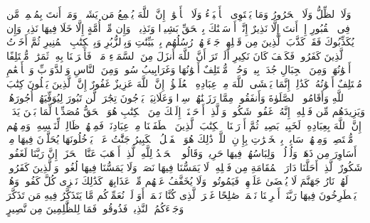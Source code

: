 وَلَا ٱلظِّلُّ وَلَا ٱلۡحَرُورُ%
\stopbuffer%
\startbuffer[\q:35:22]
وَمَا یَسۡتَوِی ٱلۡأَحۡیَاۤءُ وَلَا ٱلۡأَمۡوَٰتُۚ إِنَّ ٱللَّهَ یُسۡمِعُ مَن یَشَاۤءُۖ وَمَاۤ أَنتَ بِمُسۡمِعࣲ مَّن فِی ٱلۡقُبُورِ%
\stopbuffer%
\startbuffer[\q:35:23]
إِنۡ أَنتَ إِلَّا نَذِیرٌ%
\stopbuffer%
\startbuffer[\q:35:24]
إِنَّاۤ أَرۡسَلۡنَٰكَ بِٱلۡحَقِّ بَشِیرࣰا وَنَذِیرࣰاۚ وَإِن مِّنۡ أُمَّةٍ إِلَّا خَلَا فِیهَا نَذِیرࣱ%
\stopbuffer%
\startbuffer[\q:35:25]
وَإِن یُكَذِّبُوكَ فَقَدۡ كَذَّبَ ٱلَّذِینَ مِن قَبۡلِهِمۡ جَاۤءَتۡهُمۡ رُسُلُهُم بِٱلۡبَیِّنَٰتِ وَبِٱلزُّبُرِ وَبِٱلۡكِتَٰبِ ٱلۡمُنِیرِ%
\stopbuffer%
\startbuffer[\q:35:26]
ثُمَّ أَخَذۡتُ ٱلَّذِینَ كَفَرُوا۟ۖ فَكَیۡفَ كَانَ نَكِیرِ%
\stopbuffer%
\startbuffer[\q:35:27]
أَلَمۡ تَرَ أَنَّ ٱللَّهَ أَنزَلَ مِنَ ٱلسَّمَاۤءِ مَاۤءࣰ فَأَخۡرَجۡنَا بِهِۦ ثَمَرَٰتࣲ مُّخۡتَلِفًا أَلۡوَٰنُهَاۚ وَمِنَ ٱلۡجِبَالِ جُدَدُۢ بِیضࣱ وَحُمۡرࣱ مُّخۡتَلِفٌ أَلۡوَٰنُهَا وَغَرَابِیبُ سُودࣱ%
\stopbuffer%
\startbuffer[\q:35:28]
وَمِنَ ٱلنَّاسِ وَٱلدَّوَاۤبِّ وَٱلۡأَنۡعَٰمِ مُخۡتَلِفٌ أَلۡوَٰنُهُۥ كَذَٰلِكَۗ إِنَّمَا یَخۡشَى ٱللَّهَ مِنۡ عِبَادِهِ ٱلۡعُلَمَٰۤؤُا۟ۗ إِنَّ ٱللَّهَ عَزِیزٌ غَفُورٌ%
\stopbuffer%
\startbuffer[\q:35:29]
إِنَّ ٱلَّذِینَ یَتۡلُونَ كِتَٰبَ ٱللَّهِ وَأَقَامُوا۟ ٱلصَّلَوٰةَ وَأَنفَقُوا۟ مِمَّا رَزَقۡنَٰهُمۡ سِرࣰّا وَعَلَانِیَةࣰ یَرۡجُونَ تِجَٰرَةࣰ لَّن تَبُورَ%
\stopbuffer%
\startbuffer[\q:35:30]
لِیُوَفِّیَهُمۡ أُجُورَهُمۡ وَیَزِیدَهُم مِّن فَضۡلِهِۦۤۚ إِنَّهُۥ غَفُورࣱ شَكُورࣱ%
\stopbuffer%
\startbuffer[\q:35:31]
وَٱلَّذِیۤ أَوۡحَیۡنَاۤ إِلَیۡكَ مِنَ ٱلۡكِتَٰبِ هُوَ ٱلۡحَقُّ مُصَدِّقࣰا لِّمَا بَیۡنَ یَدَیۡهِۗ إِنَّ ٱللَّهَ بِعِبَادِهِۦ لَخَبِیرُۢ بَصِیرࣱ%
\stopbuffer%
\startbuffer[\q:35:32]
ثُمَّ أَوۡرَثۡنَا ٱلۡكِتَٰبَ ٱلَّذِینَ ٱصۡطَفَیۡنَا مِنۡ عِبَادِنَاۖ فَمِنۡهُمۡ ظَالِمࣱ لِّنَفۡسِهِۦ وَمِنۡهُم مُّقۡتَصِدࣱ وَمِنۡهُمۡ سَابِقُۢ بِٱلۡخَیۡرَٰتِ بِإِذۡنِ ٱللَّهِۚ ذَٰلِكَ هُوَ ٱلۡفَضۡلُ ٱلۡكَبِیرُ%
\stopbuffer%
\startbuffer[\q:35:33]
جَنَّٰتُ عَدۡنࣲ یَدۡخُلُونَهَا یُحَلَّوۡنَ فِیهَا مِنۡ أَسَاوِرَ مِن ذَهَبࣲ وَلُؤۡلُؤࣰاۖ وَلِبَاسُهُمۡ فِیهَا حَرِیرࣱ%
\stopbuffer%
\startbuffer[\q:35:34]
وَقَالُوا۟ ٱلۡحَمۡدُ لِلَّهِ ٱلَّذِیۤ أَذۡهَبَ عَنَّا ٱلۡحَزَنَۖ إِنَّ رَبَّنَا لَغَفُورࣱ شَكُورٌ%
\stopbuffer%
\startbuffer[\q:35:35]
ٱلَّذِیۤ أَحَلَّنَا دَارَ ٱلۡمُقَامَةِ مِن فَضۡلِهِۦ لَا یَمَسُّنَا فِیهَا نَصَبࣱ وَلَا یَمَسُّنَا فِیهَا لُغُوبࣱ%
\stopbuffer%
\startbuffer[\q:35:36]
وَٱلَّذِینَ كَفَرُوا۟ لَهُمۡ نَارُ جَهَنَّمَ لَا یُقۡضَىٰ عَلَیۡهِمۡ فَیَمُوتُوا۟ وَلَا یُخَفَّفُ عَنۡهُم مِّنۡ عَذَابِهَاۚ كَذَٰلِكَ نَجۡزِی كُلَّ كَفُورࣲ%
\stopbuffer%
\startbuffer[\q:35:37]
وَهُمۡ یَصۡطَرِخُونَ فِیهَا رَبَّنَاۤ أَخۡرِجۡنَا نَعۡمَلۡ صَٰلِحًا غَیۡرَ ٱلَّذِی كُنَّا نَعۡمَلُۚ أَوَ لَمۡ نُعَمِّرۡكُم مَّا یَتَذَكَّرُ فِیهِ مَن تَذَكَّرَ وَجَاۤءَكُمُ ٱلنَّذِیرُۖ فَذُوقُوا۟ فَمَا لِلظَّٰلِمِینَ مِن نَّصِیرٍ%

